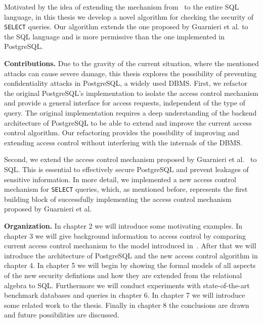 Motivated by the idea of extending the mechanism from~\cite{guarnieri2016strong} to the entire SQL language, in this thesis we develop a novel algorithm for checking the security of \texttt{SELECT} queries.
%
Our algorithm extends the one proposed by Guarnieri et al. to the SQL language and is more permissive than the one implemented in PostgreSQL.

\smallskip
\noindent
{\bf Contributions.}
%
Due to the gravity of the current situation, where the mentioned attacks can cause severe damage, this thesis explores the possibility of preventing confidentiality attacks in PostgreSQL, a widely used DBMS.
%
First, we refactor the original PostgreSQL's implementation to isolate the access control mechanism and provide a general interface for access requests, independent of the type of query.
%
The original implementation requires a deep understanding of the backend architecture of PostgreSQL to be able to extend and improve the current access control algorithm.
%
Our refactoring provides the possibility of improving and extending access control without interfering with the internals of the DBMS.

Second, we extend the access control mechanism proposed by Guarnieri et al.~\cite{guarnieri2016strong} to SQL.
%
This is essential to effectively secure PostgreSQL and prevent leakages of sensitive information.
%
In more detail, we implemented a new access control mechanism for \texttt{SELECT} queries, which, as mentioned before, represents the first building block of successfully implementing the access control mechanism proposed by Guarnieri et al.
%

\smallskip
\noindent
{\bf Organization.}
%
In chapter 2 we will introduce some motivating examples.
%
In chapter 3 we will give background information to access control by comparing current access control mechanism to the model introduced in~\cite{guarnieri2016strong}.
%
After that we will introduce the architecture of PostgreSQL and the new access control algorithm in chapter 4. 
%
In chapter 5 we will begin by showing the formal models of all aspects of the new security defintions and how they are extended from the relational algebra to SQL. 
%
Furthermore we will conduct experiments with state-of-the-art benchmark databases and queries in chapter 6. 
%
In chapter 7 we will introduce some related work to the thesis. 
%
Finally in chapter 8 the conclusions are drawn and future possibilities are discussed.